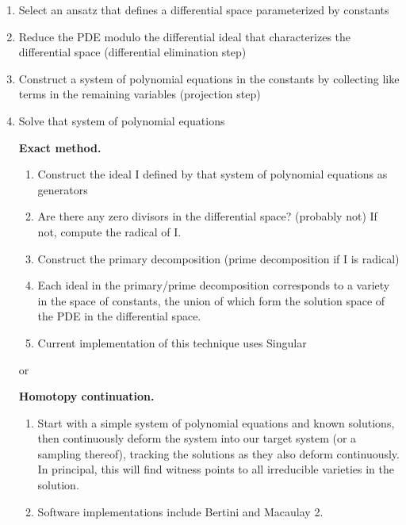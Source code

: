 \documentclass{article}
\begin{document}
\begin{enumerate}
\item Select an ansatz that defines a differential space parameterized by constants

\item Reduce the PDE modulo the differential ideal that characterizes the differential space (differential elimination step)

\item Construct a system of polynomial equations in the constants by collecting like terms in the remaining variables (projection step)

\item Solve that system of polynomial equations

{\bf Exact method.}

\begin{enumerate}

\item Construct the ideal I defined by that system of polynomial equations as generators

\item Are there any zero divisors in the differential space? (probably not)  If not, compute the radical of I.

\item Construct the primary decomposition (prime decomposition if I is radical)

\item Each ideal in the primary/prime decomposition corresponds to a variety in the space of constants,
the union of which form the solution space of the PDE in the differential space.

\item Current implementation of this technique uses Singular

\end{enumerate}

or

{\bf Homotopy continuation.}

\begin{enumerate}

\item Start with a simple system of polynomial equations and known solutions,
then continuously deform the system into our target system (or a sampling thereof), tracking the
solutions as they also deform continuously.  In principal, this will find witness points
to all irreducible varieties in the solution.

\item Software implementations include Bertini and Macaulay 2.


\end{enumerate}
\end{enumerate}
\end{document}
